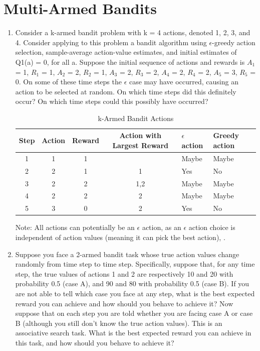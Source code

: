 \documentclass[11pt,onecolumn]{article}
\begin{document}
\section{Multi-Armed Bandits}
\begin{enumerate}
    \item Consider a k-armed bandit problem with k = 4 actions, denoted 1, 2, 3, and 4. Consider applying to this problem a bandit algorithm using $\epsilon$-greedy action selection, sample-average action-value estimates, and initial estimates of Q1(a) = 0, for all a. Suppose the initial sequence of actions and rewards is $A_1$ = 1, $R_1$ = 1, $A_2$ = 2, $R_2$ = 1, $A_3$ = 2, $R_3$ = 2, $A_4$ = 2, $R_4$ = 2, $A_5$ = 3, $R_5$ = 0. On some of these time steps the $\epsilon$ case may have occurred, causing an action to be selected at random. On which time steps did this definitely occur? On which time steps could this possibly have occurred?
    \setlength{\parskip}{6pt}
    
    \begin{table}[!htp]\centering
        \caption{k-Armed Bandit Actions}\label{tab:kab1}
        \scriptsize
        \begin{tabular}{ccccll}\toprule
        Step & Action & Reward & Action with Largest Reward& $\epsilon$ action  & Greedy action\\\midrule
        1   &1 &1  &  &Maybe  &Maybe \\
        2   &2 &1  &1  &Yes    &No \\
        3   &2 &2  &1,2  &Maybe  &Maybe \\
        4   &2 &2  &2  &Maybe  &Maybe \\
        5   &3 &0  &2  &Yes  &No \\
        \end{tabular}
    \end{table}
    Note: All actions can potentially be an $\epsilon$ action, as an $\epsilon$ action choice is independent of action values (meaning it can pick the best action), .

    \item Suppose you face a 2-armed bandit task whose true action values change randomly from time step to time step. Specifically, suppose that, for any time step, the true values of actions 1 and 2 are respectively 10 and 20 with probability 0.5 (case A), and 90 and 80 with probability 0.5 (case B). If you are not able to tell which case you face at any step, what is the best expected reward you can achieve and how should you behave to achieve it? Now suppose that on each step you are told whether you are facing case A or case B (although you still don’t know the true action values). This is an associative search task. What is the best expected reward you can achieve in this task, and how should you behave to achieve it?
    \setlength{\parskip}{6pt}
    

\end{enumerate}
\end{document}
